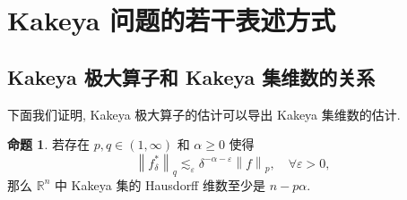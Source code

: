 \documentclass[a4paper]{article}
\numberwithin{equation}{section}
\numberwithin{figure}{section}
\numberwithin{table}{section}
\theoremstyle{definition}
\newtheorem{proposition}[theorem]{\indent 命题}
\newcommand{\norm}[1]{\left\lVert #1 \right\rVert}
\renewcommand{\geq}{\geqslant}
\newcommand{\ls}{\lesssim}
\newcommand{\R}{\mathbb{R}}
\newcommand{\e}{\varepsilon}
\begin{document}
\section{Kakeya 问题的若干表述方式}

\subsection{Kakeya 极大算子和 Kakeya 集维数的关系}
\label{subsec: 极大算子 vs Kakeya 集}

下面我们证明, Kakeya 极大算子的估计可以导出 Kakeya 集维数的估计.

\begin{proposition}
    \label{prop: maximal func and kakeya dim}
    若存在 $p, q\in (1, \infty)$ 和 $\alpha\geq 0$ 使得
    \begin{equation}
        \label{eq: Kakeya 算子的估计}
        \norm{f^*_\delta}_q\ls_\e\delta^{-\alpha-\e}\norm{f}_p,\quad\forall\e>0,
    \end{equation}
    那么 $\R^n$ 中 Kakeya 集的 Hausdorff 维数至少是 $n-p\alpha$.
\end{proposition}
\end{document}
